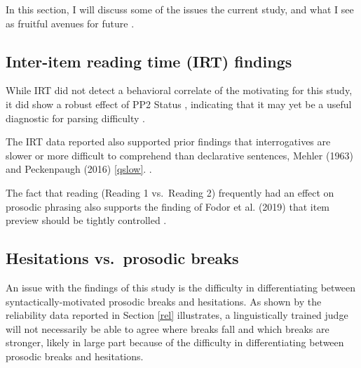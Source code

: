 \documentclass[12pt,oneside]{book}
\begin{document}
In this section, I will discuss some of the  issues  the current study, and what I see as fruitful avenues for future .

\hypertarget{inter-item-reading-time-irt-findings}{%
\subsection{Inter-item reading time (IRT) findings}\label{inter-item-reading-time-irt-findings}}


While IRT did not detect a behavioral correlate of the motivating  for this study, it did show a robust effect of PP2 Status , indicating that it may yet be a useful diagnostic for parsing difficulty .

The IRT data reported also supported prior findings that interrogatives are  slower  or more difficult to comprehend than  declarative sentences,  Mehler (1963) and Peckenpaugh (2016)  \ref{qslow}\added[id=JDF]{)}. .

The fact that reading (Reading 1 vs.~Reading 2) frequently had an effect on prosodic phrasing also supports the finding of Fodor et al. (2019) that  item preview should be tightly controlled .

\hypertarget{hesitations-vs.-prosodic-breaks}{%
\subsection{Hesitations vs.~prosodic breaks}\label{hesitations-vs.-prosodic-breaks}}

An issue with the findings of this study is the difficulty in differentiating between syntactically-motivated prosodic breaks and hesitations. As shown by the reliability data reported in Section \ref{rel} illustrates, a linguistically trained judge will not necessarily be able to agree where breaks fall and which breaks are stronger, likely in large part because of the difficulty in differentiating between prosodic breaks and hesitations.
\end{document}
